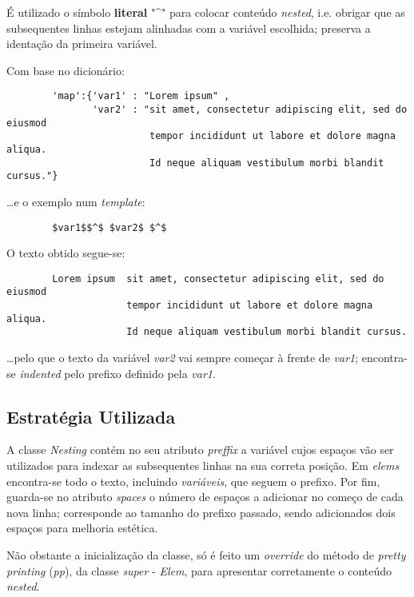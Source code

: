 \documentclass[../relatorio.tex]{subfiles}
\begin{document}
    É utilizado o símbolo \textbf{literal} "\^{}" para 
    colocar conteúdo \textit{nested}, i.e. obrigar que
    as subsequentes linhas estejam alinhadas com a variável 
    escolhida; preserva a identação da primeira variável.

    Com base no dicionário:

    \begin{verbatim}
        'map':{'var1' : "Lorem ipsum" , 
               'var2' : "sit amet, consectetur adipiscing elit, sed do eiusmod
                         tempor incididunt ut labore et dolore magna aliqua. 
                         Id neque aliquam vestibulum morbi blandit cursus."}
    \end{verbatim}

    \dots e o exemplo num \textit{template}:

    \begin{verbatim}
        $var1$$^$ $var2$ $^$
    \end{verbatim}
                           
    O texto obtido segue-se:
    \begin{verbatim}
        Lorem ipsum  sit amet, consectetur adipiscing elit, sed do eiusmod
                     tempor incididunt ut labore et dolore magna aliqua. 
                     Id neque aliquam vestibulum morbi blandit cursus.
    \end{verbatim}

    \dots pelo que o texto da variável \textit{var2} vai sempre começar 
    à frente de \textit{var1}; encontra-se \textit{indented} pelo prefixo 
    definido pela \textit{var1}.
    
    \subsection*{Estratégia Utilizada}
    
    A classe \textit{Nesting} contém no seu atributo \textit{preffix} a 
    variável cujos espaços vão ser utilizados para indexar as subsequentes
    linhas na sua correta posição.
    Em \textit{elems} encontra-se todo o texto, incluindo \textit{variáveis},
    que seguem o prefixo.
    Por fim, guarda-se no atributo \textit{spaces} o número de espaços a adicionar
    no começo de cada nova linha; corresponde ao tamanho do prefixo passado,
    sendo adicionados dois espaços para melhoria estética.
    
    Não obstante a inicialização da classe, só é feito um \textit{override}
    do método de \textit{pretty printing} (\textit{pp}), da classe 
    \textit{super} - \textit{Elem}, para apresentar corretamente 
    o conteúdo \textit{nested}.
    
\end{document}
